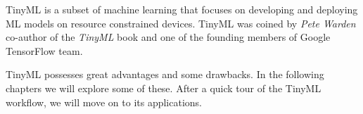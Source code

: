 \documentclass[../../main]{subfiles}
\begin{document}

TinyML is a subset of machine learning that focuses on developing and
deploying ML models on resource constrained devices. TinyML was coined
by \emph{Pete Warden} co-author of the \emph{TinyML} book and one of the
founding members of Google TensorFlow team.

TinyML possesses great advantages and some drawbacks. In the following
chapters we will explore some of these. After a quick tour of the TinyML
workflow, we will move on to its applications.
\end{document}
